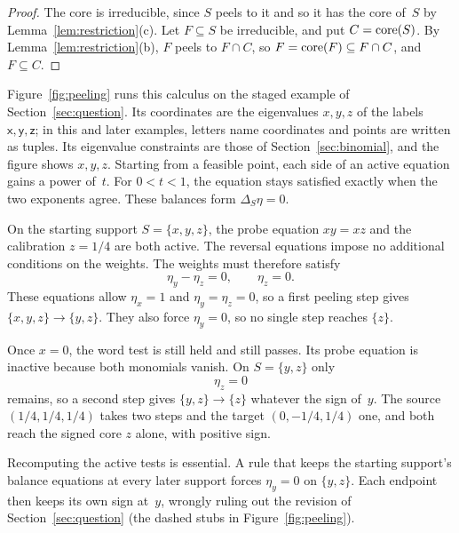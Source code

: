 \begin{proof}
The core is irreducible, since $S$ peels to it and so it has the core
of~$S$ by Lemma~\ref{lem:restriction}(c). Let $F\subseteq S$ be
irreducible, and put $C=\operatorname{core}(S)$. By Lemma~\ref{lem:restriction}(b), $F$
peels to $F\cap C$, so $F=\operatorname{core}(F)\subseteq F\cap C$, and $F\subseteq C$.
\end{proof}

Figure~\ref{fig:peeling} runs this calculus on the staged example of
Section~\ref{sec:question}. Its coordinates are the eigenvalues $x,y,z$ of
the labels $\mathsf x,\mathsf y,\mathsf z$; in this and later examples,
letters name coordinates and points are written as tuples.
Its eigenvalue constraints are those of Section~\ref{sec:binomial}, and
the figure shows $x,y,z$. Starting from a
feasible point, each side of an active equation gains a power of~$t$. For
$0<t<1$, the equation stays satisfied exactly when the two exponents agree.
These balances form $\Delta_S\eta=0$.

On the starting support $S=\{x,y,z\}$, the probe equation $xy=xz$ and the
calibration $z=1/4$ are both active. The reversal equations impose no
additional conditions on the weights. The weights must therefore satisfy
\[
  \eta_y-\eta_z=0,\qquad \eta_z=0 .
\]
These equations allow $\eta_x=1$ and $\eta_y=\eta_z=0$, so a first peeling
step gives $\{x,y,z\}\to\{y,z\}$. They also force $\eta_y=0$, so no single
step reaches $\{z\}$.

Once $x=0$, the word test is still held and still passes. Its probe
equation is inactive because both monomials vanish. On $S=\{y,z\}$ only
\[
  \eta_z=0
\]
remains, so a second step gives $\{y,z\}\to\{z\}$ whatever the sign
of~$y$. The source $(1/4,1/4,1/4)$ takes two steps and the target
$(0,-1/4,1/4)$ one, and both reach the signed core $z$ alone, with
positive sign.

Recomputing the active tests is essential. A rule that keeps the starting
support's balance equations at every later support forces $\eta_y=0$ on
$\{y,z\}$. Each endpoint then keeps its own sign at~$y$, wrongly ruling out
the revision of Section~\ref{sec:question} (the dashed stubs in
Figure~\ref{fig:peeling}).

